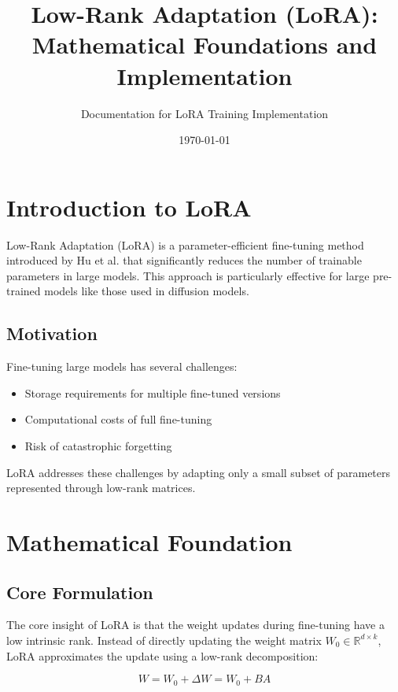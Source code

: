 \documentclass{article}
\title{Low-Rank Adaptation (LoRA): Mathematical Foundations and Implementation}
\author{Documentation for LoRA Training Implementation}
\date{\today}
\begin{document}
\maketitle

\tableofcontents

\section{Introduction to LoRA}

Low-Rank Adaptation (LoRA) is a parameter-efficient fine-tuning method introduced by Hu et al. \cite{hu2021lora} that significantly reduces the number of trainable parameters in large models. This approach is particularly effective for large pre-trained models like those used in diffusion models.

\subsection{Motivation}

Fine-tuning large models has several challenges:
\begin{itemize}
    \item Storage requirements for multiple fine-tuned versions
    \item Computational costs of full fine-tuning
    \item Risk of catastrophic forgetting
\end{itemize}

LoRA addresses these challenges by adapting only a small subset of parameters represented through low-rank matrices.

\section{Mathematical Foundation}

\subsection{Core Formulation}

The core insight of LoRA is that the weight updates during fine-tuning have a low intrinsic rank. Instead of directly updating the weight matrix $W_0 \in \mathbb{R}^{d \times k}$, LoRA approximates the update using a low-rank decomposition:

\begin{equation}
W = W_0 + \Delta W = W_0 + BA
\end{equation}
\end{document}
